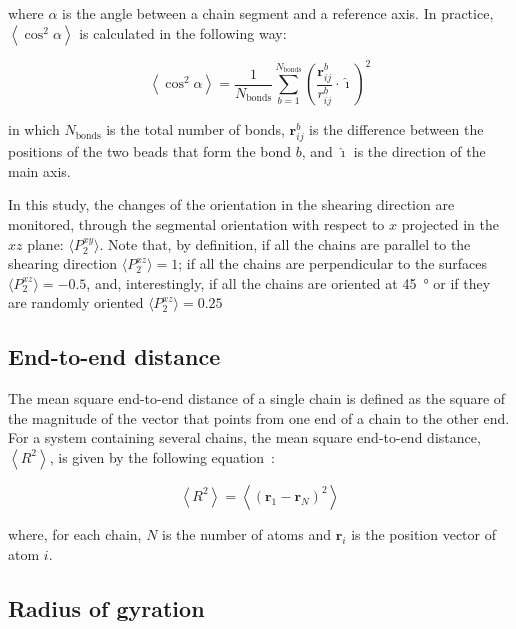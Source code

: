 \documentclass[5p]{elsarticle}
\begin{document}
\noindent where $\alpha$ is the angle between a chain segment and a reference axis. In practice, $\left\langle \cos ^2 \alpha \right\rangle$ is calculated in the following way:

\begin{equation}
\left\langle \cos ^2 \alpha \right\rangle = \frac{1}{N_\text{bonds}} \sum_{b=1}^{N_\text{bonds}} \left(\frac{\textbf{r}^b_{ij}}{r^b_{ij}} \cdot \mathbf{\hat \imath} \right)^2
\end{equation}

 in which $N_\text{bonds}$ is the total number of bonds, $\textbf{r}^b_{ij}$ is the difference between the positions of the two beads that form the bond $b$, and $\mathbf{\hat \imath}$ is the direction of the main axis. 
 
 In this study, the changes of the orientation in the shearing direction are monitored, through the segmental orientation with respect to $x$ projected in the $xz$ plane: $\langle P_{2}^{xy}\rangle$. Note that, by definition,  if all the chains are parallel to the shearing direction $\langle P_{2}^{xz}\rangle=1 $; if all the chains are perpendicular to the surfaces $\langle P_{2}^{xz} \rangle=-0.5$, and, interestingly, if all the chains are oriented at \SI{45}{\degree} or if they are randomly oriented $\langle P_{2}^{xz}\rangle=0.25 $
 

\subsection{End-to-end distance}

The mean square end-to-end distance of a single chain is defined as the square  of the magnitude of the vector that points from one end of a chain to the other end. For a system containing several chains, the mean square end-to-end distance, $\left< R^2 \right>$, is given by the following equation~\cite{Brown1994}:

\begin{equation}
	\left< R^2 \right> = \left<\left( \mathbf{r}_1 - \mathbf{r}_N \right)^2\right>
	\label{eq:e2e2}
\end{equation}

\noindent where, for each chain,  $N$ is the number of atoms and  $ \mathbf{r}_i$ is the position vector of atom $i$. 


\subsection{Radius of gyration}
\end{document}
